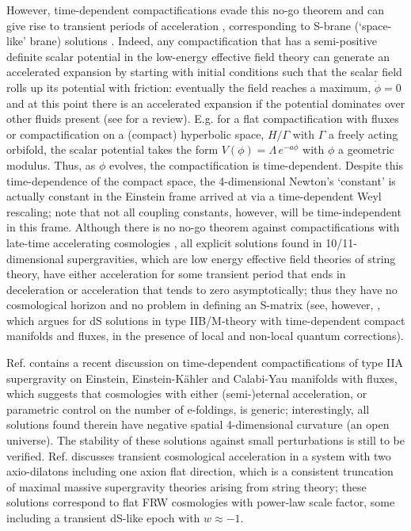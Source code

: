 However, time-dependent compactifications evade this no-go theorem \cite{Townsend:2003fx} and can give rise to transient periods of acceleration \cite{Townsend:2003fx, Ohta:2003pu, Ohta:2003ie, Ohta:2004wk, Roy:2003nd, Emparan:2003gg, Gutperle:2003kc}, corresponding to S-brane (`space-like' brane) solutions \cite{Gutperle:2002ai, Ohta:2003pu, Emparan:2003gg}. Indeed, any compactification that has a semi-positive definite scalar potential in the low-energy effective field theory can generate an accelerated expansion by starting with initial conditions such that the scalar field rolls up its potential with friction: eventually the field reaches a maximum, $\dot{\phi}=0$ and at this point there is an accelerated expansion if the potential dominates over other fluids present (see \cite{Townsend:2003qv} for a review). E.g. for a flat compactification with fluxes or compactification on a (compact) hyperbolic space, $H/\Gamma$ with $\Gamma$ a freely acting orbifold, the scalar potential takes the form $V(\phi)=\Lambda\, e^{-a\phi}$ with $\phi$ a geometric modulus. Thus, as $\phi$ evolves, the compactification is time-dependent. Despite this time-dependence of the compact space, the 4-dimensional Newton's `constant' is actually constant in the Einstein frame arrived at via a time-dependent Weyl rescaling; note that not all coupling constants, however, will be time-independent in this frame. Although there is no no-go theorem against compactifications with late-time accelerating cosmologies \cite{Russo:2018akp}, all explicit solutions found in 10/11-dimensional supergravities, which are low energy effective field theories of string theory, have either acceleration for some transient period that ends in deceleration or acceleration that tends to zero asymptotically; thus they have no cosmological horizon and no problem in defining an S-matrix (see, however, \cite{Dasgupta:2019gcd}, which argues for dS solutions in type IIB/M-theory with time-dependent compact manifolds and fluxes, in the presence of local and non-local quantum corrections).

Ref. \cite{Marconnet:2022fmx} contains a recent discussion on time-dependent compactifications of type IIA supergravity on Einstein, Einstein-K\"ahler and Calabi-Yau manifolds with fluxes, which suggests that cosmologies with either (semi-)eternal acceleration, or parametric control on the number of e-foldings, is generic; interestingly, all solutions found therein have negative spatial 4-dimensional curvature (an open universe). The stability of these solutions against small perturbations is still to be verified. Ref. \cite{Russo:2022pgo} discusses transient cosmological acceleration in a system with two axio-dilatons including one axion flat direction, which is a consistent truncation of maximal massive supergravity theories arising from string theory; these solutions correspond to flat FRW cosmologies with power-law scale factor, some including a transient dS-like epoch with $w\approx -1$.

